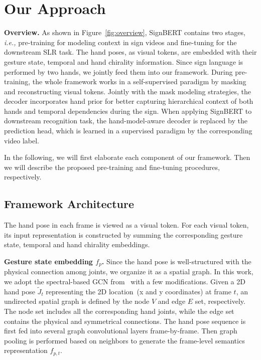 \documentclass[10pt,twocolumn,letterpaper]{article}
\begin{document}
\section{Our Approach}

\noindent \textbf{Overview.}
As shown in Figure~\ref{fig:overview}, SignBERT contains two stages, \emph{i.e.,} pre-training for modeling context in sign videos and fine-tuning for the downstream SLR task.
The hand poses, as visual tokens, are embedded with their gesture state, temporal and hand chirality information.
Since sign language is performed by two hands, we jointly feed them into our framework.
During pre-training, the whole framework works in a self-supervised paradigm by masking and reconstructing visual tokens.
Jointly with the mask modeling strategies, the decoder incorporates hand prior for better capturing hierarchical context of both hands and temporal dependencies during the sign.
When applying SignBERT to downstream recognition task, the hand-model-aware decoder is replaced by the prediction head, which is learned in a supervised paradigm by the corresponding video label.

In the following, we will first elaborate each component of our framework.
Then we will describe the proposed pre-training and fine-tuning procedures, respectively.


\subsection{Framework Architecture}
The hand pose in each frame is viewed as a visual token.
For each visual token, its input representation is constructed by summing the corresponding gesture state, temporal and hand chirality embeddings.

\noindent \textbf{Gesture state embedding $f_p$.}
Since the hand pose is well-structured with the physical connection among joints, we organize it as a spatial graph.
In this work, we adopt the spectral-based GCN from~\cite{cai2019exploiting, yan2018spatial} with a few modifications.
Given a 2D hand pose $\widetilde{J}_{t}$ representing the 2D location~(x and y coordinates) at frame $t$, an undirected spatial graph is defined by the node $V$ and edge $E$ set, respectively.
The node set includes all the corresponding hand joints, while the edge set contains the physical and symmetrical connections.
The hand pose sequence is first fed into several graph convolutional layers frame-by-frame.
Then graph pooling is performed based on neighbors to generate the frame-level semantics representation $f_{p,t}$.
\end{document}

